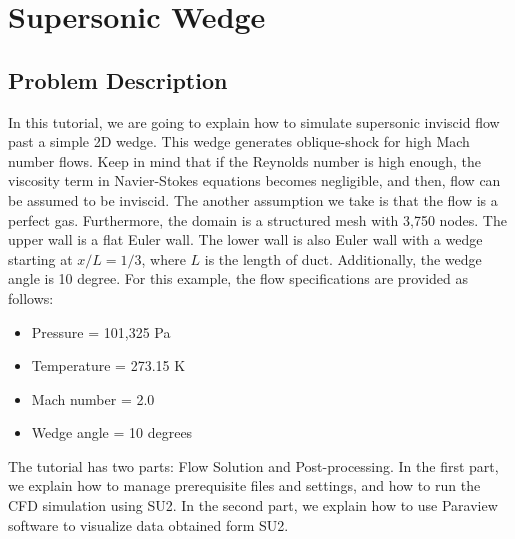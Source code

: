 \chapter{Supersonic Wedge}
\label{ch:Supersonic Wedge}
\section{Problem Description}
In this tutorial, we are going to explain how to simulate supersonic inviscid flow past a simple 2D wedge. This wedge generates oblique-shock for high Mach number flows. Keep in mind that if the Reynolds number is high enough, the viscosity term in Navier-Stokes equations becomes negligible, and then, flow can be assumed to be inviscid. The another assumption we take is that the flow is a perfect gas. Furthermore, the domain is a structured mesh with 3,750 nodes. The upper wall is a flat Euler wall. The lower wall is also Euler wall with a wedge starting at $x/L=1/3$, where $L$ is the length of duct. Additionally, the wedge angle is 10 degree. For this example, the flow specifications are provided as follows:
\begin{itemize}
    \item Pressure = 101,325 Pa
    \item Temperature = 273.15 K
    \item Mach number = 2.0
    \item Wedge angle = 10 degrees
\end{itemize}
The tutorial has two parts: Flow Solution and Post-processing. In the first part, we explain how to manage prerequisite files and settings, and how to run the CFD simulation using SU2. In the second part, we explain how to use Paraview software to visualize data obtained form SU2.
